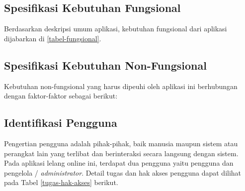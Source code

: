   \subsection{Spesifikasi Kebutuhan Fungsional}
  \vspace{-5mm}
  Berdasarkan deskripsi umum aplikasi, kebutuhan fungsional dari aplikasi dijabarkan di \cref{tabel-fungsional}.

  
  \subsection{Spesifikasi Kebutuhan Non-Fungsional}
  
  Kebutuhan non-fungsional yang harus dipeuhi oleh aplikasi ini berhubungan dengan faktor-faktor sebagai berikut:

  
  \newpage
  
  \subsection{Identifikasi Pengguna}
  Pengertian pengguna adalah pihak-pihak, baik manusia maupun sistem atau perangkat lain yang terlibat dan berinteraksi secara langsung dengan sistem. Pada aplikasi lelang online ini, terdapat dua pengguna yaitu pengguna dan pengelola / \textit{administrator}. Detail tugas dan hak akses pengguna dapat dilihat pada Tabel \ref{tugas-hak-akses} berikut.
  
\begin{table}[H]
\centering
{}
\caption{Detail Tugas dan Hak Akses Pengguna}
\label{tugas-hak-akses}
\end{table}
  
  